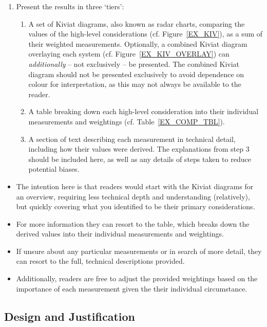 \begin{enumerate}
    \item Present the results in three `tiers':
    \begin{enumerate}
      \item A set of Kiviat diagrams, also known as radar charts, comparing the values of the high-level considerations (cf. Figure~\ref{EX_KIV}), as a sum of their weighted measurements. Optionally, a combined Kiviat diagram overlaying each system (cf. Figure~\ref{EX_KIV_OVERLAY}) can \emph{additionally} -- not exclusively -- be presented. The combined Kiviat diagram should not be presented exclusively to avoid dependence on colour for interpretation, as this may not always be available to the reader.
      \item A table breaking down each high-level consideration into their individual measurements and weightings (cf. Table~\ref{EX_COMP_TBL}).
      \item A section of text describing each measurement in technical detail, including how their values were derived. The explanations from step 3 should be included here, as well as any details of steps taken to reduce potential biases.
    \end{enumerate}
  \end{enumerate}

  \begin{itemize}
    \item The intention here is that readers would start with the Kiviat diagrams for an overview, requiring less technical depth and understanding (relatively), but quickly covering what you identified to be their primary considerations.
    \item For more information they can resort to the table, which breaks down the derived values into their individual measurements and weightings.
    \item If unsure about any particular measurements or in search of more detail, they can resort to the full, technical descriptions provided.
    \item Additionally, readers are free to adjust the provided weightings based on the importance of each measurement given the their individual circumstance.
  \end{itemize}


\subsection{Design and Justification}
\label{DESIGN_AND_JUSTIFICATION}

